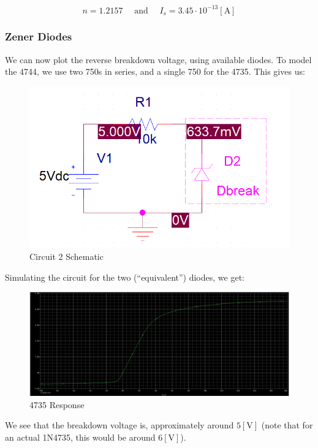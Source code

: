 \documentclass[
	letterpaper, %
	10pt, %
]{CSUniSchoolLabReport}
\begin{document}
  $$\boxed{n=1.2157\quad\text{ and }\quad I_s=3.45\cdot10^{-13}[\si{\ampere}]}$$

  \subsubsection{Zener Diodes}

  We can now plot the reverse breakdown voltage, using available diodes. To model the 4744, we use two 750s in series, and a single 750 for the 4735. This gives us:

  \begin{figure}[H]
    \centering
    \includegraphics[width=.9\textwidth]{Figures/L2F12}
    \caption{Circuit 2 Schematic}
    \label{fig:13}
  \end{figure}

  Simulating the circuit for the two (``equivalent'') diodes, we get:

  \begin{figure}[H]
    \centering
    \includegraphics[width=.9\textwidth]{Figures/L2F13}
    \caption{4735 Response}
    \label{fig:14}
  \end{figure}

  We see that the breakdown voltage is, approximately around $5[\si{\volt}]$ (note that for an actual 1N4735, this would be around $6[\si{\volt}]$).
\end{document}
